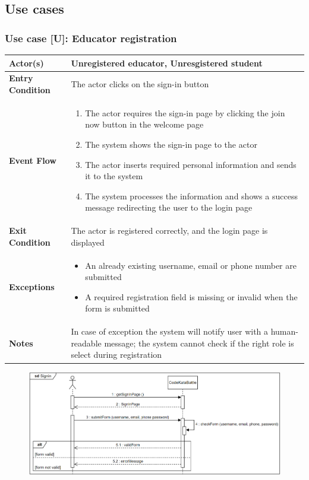 \documentclass[12pt, a4paper]{report}
\newcounter{useCase}
\newcommand{\usecase}[9]{
    \def\arraystretch{1.5} 
    \subsubsection*{Use case [U#2]: #3}
    \vspace*{0.2cm}
    \begin{center}
        \begin{tabular}{|l|p{12cm}|}
            \hline
            \textbf{Actor(s)} & #4 \\
            \hline
            \textbf{Entry Condition} & #5 \\
            \hline
            \textbf{Event Flow} & #6 \\
            \hline
            \textbf{Exit Condition} & #7 \\
            \hline
            \textbf{Exceptions} & #8 \\
            \hline
            \textbf{Notes} & #9 \\
            \hline
        \end{tabular}
    \end{center}
    #1
}
\begin{document}
        \subsection{Use cases}
        \usecase 
        {\begin{figure}[H]\centering\includegraphics[width=0.9\linewidth]{images/signup.png}\end{figure}}        
        {\arabic{useCase}\stepcounter{useCase}}
        {Educator registration}
        {Unregistered educator, Unresgistered student}
        {The actor clicks on the sign-in button}
        {
        \begin{enumerate}
            \item The actor requires the sign-in page by clicking the join now button in the welcome page
            \item The system shows the sign-in page to the actor
            \item The actor inserts required personal information and sends it to the system
            \item The system processes the information and shows a success message redirecting the user to the login page
        \end{enumerate}
        }
        {The actor is registered correctly, and the login page is displayed}
        {
        \begin{itemize}
            \item An already existing username, email or phone number are submitted
            \item A required registration field is missing or invalid when the form is submitted
        \end{itemize}
        }
        {In case of exception the system will notify user with a human-readable message; the system cannot check if the right role is select during registration}
\end{document}
